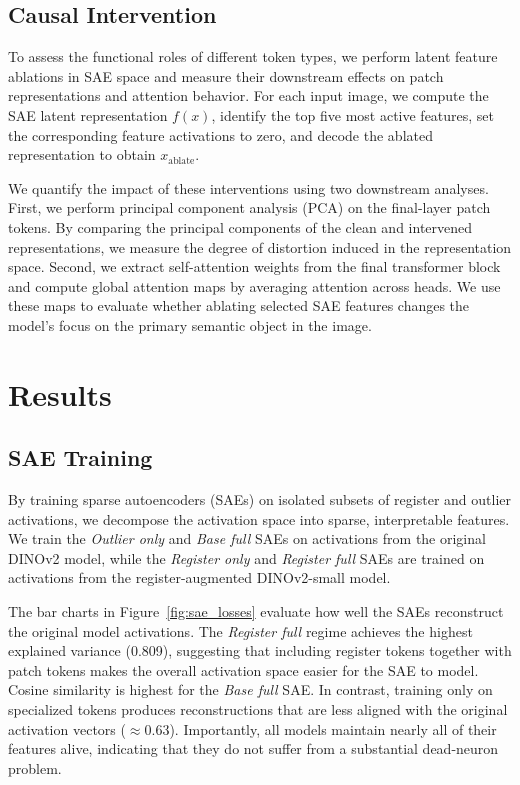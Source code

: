 \documentclass{article}
\theoremstyle{plain}
\theoremstyle{definition}
\theoremstyle{remark}
\begin{document}
\subsection{Causal Intervention}

To assess the functional roles of different token types, we perform latent feature ablations in SAE space and measure their downstream effects on patch representations and attention behavior. For each input image, we compute the SAE latent representation \(f(x)\), identify the top five most active features, set the corresponding feature activations to zero, and decode the ablated representation to obtain \(x_{\mathrm{ablate}}\).

We quantify the impact of these interventions using two downstream analyses. First, we perform principal component analysis (PCA) on the final-layer patch tokens. By comparing the principal components of the clean and intervened representations, we measure the degree of distortion induced in the representation space. Second, we extract self-attention weights from the final transformer block and compute global attention maps by averaging attention across heads. We use these maps to evaluate whether ablating selected SAE features changes the model’s focus on the primary semantic object in the image.

\section{Results}

\subsection{SAE Training}

By training sparse autoencoders (SAEs) on isolated subsets of register and outlier activations, we decompose the activation space into sparse, interpretable features. We train the \textit{Outlier only} and \textit{Base full} SAEs on activations from the original DINOv2
model, while the \textit{Register only} and \textit{Register full} SAEs are trained on activations from the register-augmented DINOv2-small model.

The bar charts in Figure~\ref{fig:sae_losses} evaluate how well the SAEs reconstruct the original model activations. The \textit{Register full} regime achieves the highest explained variance (0.809), suggesting that including register tokens together with patch tokens makes the overall activation space easier for the SAE to model. Cosine similarity is highest for the \textit{Base full} SAE. In contrast, training only on specialized tokens produces reconstructions that are less aligned with the original activation vectors (\(\approx 0.63\)). Importantly, all models maintain nearly all of their features alive, indicating that they do not suffer from a substantial dead-neuron problem.
\end{document}
